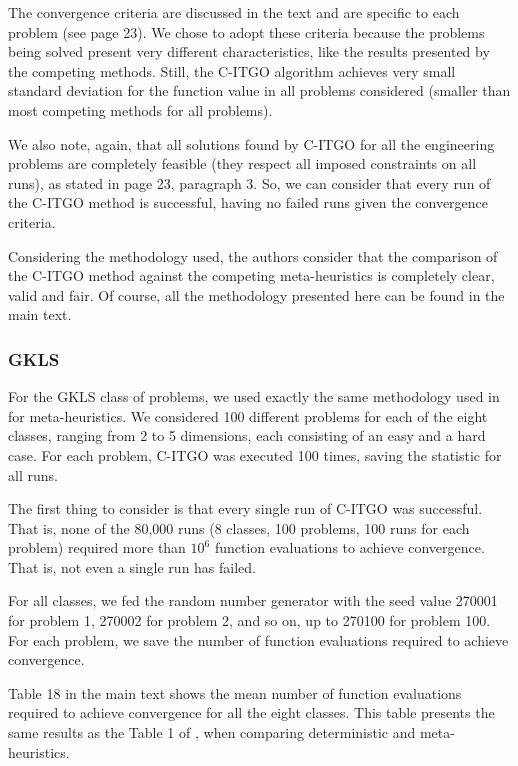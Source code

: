 \begin{revAns}
The convergence criteria are discussed in the text and are specific to each problem (see page 23). We chose to adopt these criteria because the problems being solved present very different characteristics, like the results presented by the competing methods. Still, the C-ITGO algorithm achieves very small standard deviation for the function value in all problems considered (smaller than most competing methods for all problems).

We also note, again, that all solutions found by C-ITGO for all the engineering problems are completely feasible (they respect all imposed constraints on all runs), as stated in page 23, paragraph 3. So, we can consider that every run of the C-ITGO method is successful, having no failed runs given the convergence criteria.

Considering the methodology used, the authors consider that the comparison of the C-ITGO method against the competing meta-heuristics is completely clear, valid and fair. Of course, all the methodology presented here can be found in the main text.



\subsubsection*{GKLS}

For the GKLS class of problems, we used exactly the same methodology used in \cite{NAT} for meta-heuristics. We considered 100 different problems for each of the eight classes, ranging from 2 to 5 dimensions, each consisting of an easy and a hard case. For each problem, C-ITGO was executed 100 times, saving the statistic for all runs.

The first thing to consider is that every single run of C-ITGO was successful. That is, none of the 80,000 runs (8 classes, 100 problems, 100 runs for each problem) required more than $10^6$ function evaluations to achieve convergence. That is, not even a single run has failed.

For all classes, we fed the random number generator with the seed value 270001 for problem 1, 270002 for problem 2, and so on, up to 270100 for problem 100. For each problem, we save the number of function evaluations required to achieve convergence.

Table 18 in the main text shows the mean number of function evaluations required to achieve convergence for all the eight classes. This table presents the same results as the Table 1 of \cite{NAT}, when comparing deterministic and meta-heuristics.


\end{revAns}
